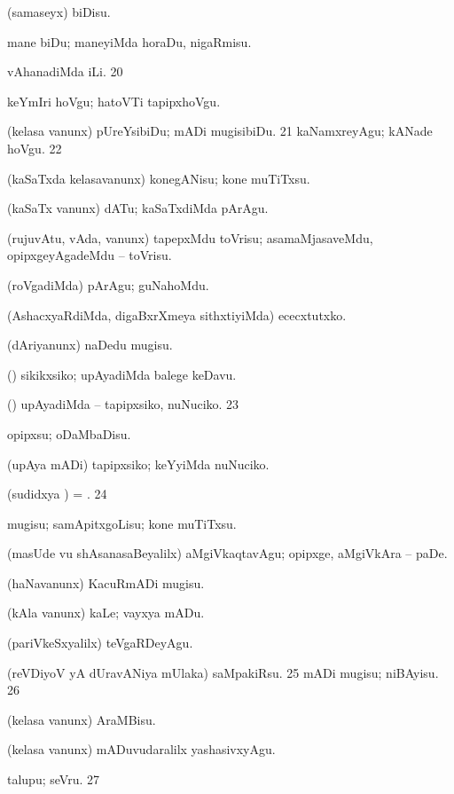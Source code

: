 {{ (samaseyx) biDisu. 

 mane biDu; maneyiMda horaDu, nigaRmisu. 

 vAhanadiMda iLi. 
\num{20}  

 keYmIri hoVgu; hatoVTi tapipxhoVgu. 

 (kelasa \mo vanunx) pUreYsibiDu; mADi mugisibiDu. 
\num{21}  kaNamxreyAgu; kANade hoVgu. 
\num{22}  

 (kaSaTxda kelasavanunx) konegANisu; kone muTiTxsu. 

 (kaSaTx \mo vanunx) dATu; kaSaTxdiMda pArAgu. 

 (rujuvAtu, vAda, \mo vanunx) tapepxMdu toVrisu; asamaMjasaveMdu, opipxgeyAgadeMdu -- toVrisu. 

 (roVgadiMda) pArAgu; guNahoMdu. 

 (AshacxyaRdiMda, digaBxrXmeya sithxtiyiMda) ececxtutxko.

 (dAriyanunx) naDedu mugisu. 

 (\ashi) sikikxsiko; upAyadiMda balege keDavu.

 (\ashi) upAyadiMda -- tapipxsiko, nuNuciko. 
\num{23}  

 opipxsu; oDaMbaDisu. 

 (upAya mADi) tapipxsiko; keYyiMda nuNuciko. 

 (sudidxya \vi) =  \hyperlink{get nuga1c}{\pagu {}}. 
\num{24}  

 mugisu; samApitxgoLisu; kone muTiTxsu. 

 (masUde \mo vu shAsanasaBeyalilx) aMgiVkaqtavAgu; opipxge, aMgiVkAra -- paDe. 

 (haNavanunx) KacuRmADi mugisu.

 (kAla \mo vanunx) kaLe; vayxya mADu. 

 (pariVkeSxyalilx) teVgaRDeyAgu. 

 (reVDiyoV yA dUravANiya mUlaka) saMpakiRsu. 
\num{25}  mADi mugisu; niBAyisu. 
\num{26}  

 (kelasa \mo vanunx) AraMBisu. 

 (kelasa \mo vanunx) mADuvudaralilx  yashasivxyAgu. 

 talupu; seVru. 
\num{27}  

}}
